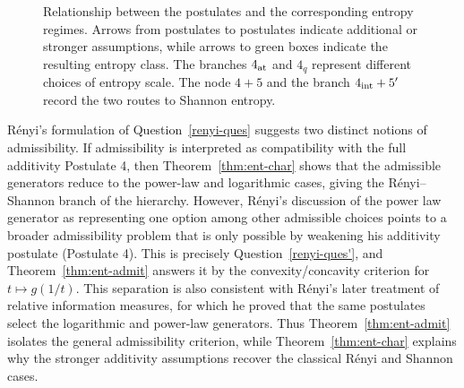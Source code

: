 \documentclass[reqno]{amsart}
\begin{document}
\begin{figure}[t]
{%
}
\caption{Relationship between the postulates and the corresponding entropy
regimes. Arrows from postulates to postulates indicate additional or
stronger assumptions, while arrows to green boxes indicate the resulting
entropy class. The branches $4_{\rm at}$ and $4_q$ represent different
choices of entropy scale. The node $4+5$ and the branch
$4_{\rm int}+5'$ record the two routes to Shannon entropy.}
\label{fig:postulate-tree}
\end{figure}



\begin{remark}
R\'enyi's formulation of Question~\ref{renyi-ques} suggests two distinct notions of admissibility. If admissibility is interpreted as compatibility with the full additivity Postulate 4, then Theorem~\ref{thm:ent-char} shows that the admissible generators reduce to the power-law and logarithmic cases, giving the R\'enyi--Shannon branch of the hierarchy. However, R\'enyi's discussion of the power law generator as representing one option among other admissible choices points to a broader admissibility problem that is only possible by weakening his additivity postulate (Postulate 4). This is precisely Question~\ref{renyi-ques'}, and Theorem~\ref{thm:ent-admit} answers it by the convexity/concavity criterion for $t\mapsto g(1/t)$. This separation is also consistent with R\'enyi's later treatment of relative information measures, for which he proved that the same postulates select the logarithmic and power-law generators. Thus Theorem~\ref{thm:ent-admit} isolates the general admissibility criterion, while Theorem~\ref{thm:ent-char} explains why the stronger additivity assumptions recover the classical Rényi and Shannon cases.
\end{remark}
\end{document}
